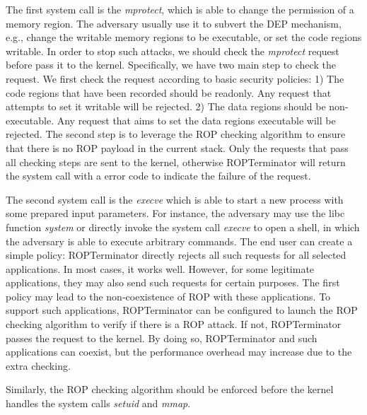 The first system call is the \emph{mprotect}, which is able to change the permission of a memory region. The adversary usually use it to subvert the DEP mechanism, e.g., change the writable memory regions to be executable, or set the code regions writable. In order to stop such attacks, we should check the \emph{mprotect} request before pass it to the kernel. Specifically, we have two main step to check the request. We first check the request according to basic security policies: 1) The code regions that have been recorded should be readonly. Any request that attempts to set it writable  will be rejected. 2) The data regions should be non-executable. Any request that aims to set the data regions executable will be rejected. The second step is to leverage the ROP checking algorithm to ensure that there is no ROP payload in the current stack. Only the requests that pass all checking steps are sent to the kernel, otherwise ROPTerminator will return the system call with a error code to indicate the failure of the request.

The second system call is the \emph{execve} which is able to start a new process with some prepared input parameters. For instance, the adversary may use the libc function \emph{system} or directly invoke the system call \emph{execve} to open a shell, in which the adversary is able to execute  arbitrary commands.
The end user can create a simple policy: ROPTerminator directly rejects all such requests for all selected applications. In most cases, it works well. However, for some legitimate applications, they may also send such requests for certain purposes. The first policy may lead to the non-coexistence of ROP with these applications.
To support such applications, ROPTerminator can be configured to launch the ROP checking algorithm to verify if there is a ROP attack. If not, ROPTerminator passes the request to the kernel. By doing so, ROPTerminator and such applications can coexist, but the performance overhead may increase due to the extra checking.

Similarly, the ROP checking algorithm should be enforced before the kernel handles the system calls \emph{setuid} and \emph{mmap}.

